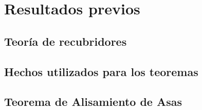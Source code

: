 
\chapter{Resultados previos}


\section{Teoría de recubridores}

	
	
\section{Hechos utilizados para los teoremas}

	

\section{Teorema de Alisamiento de Asas}

	

\endinput
